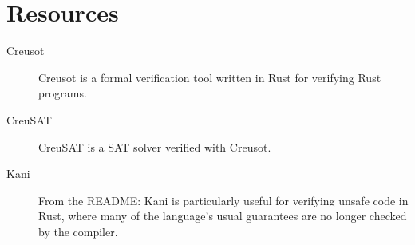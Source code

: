 \documentclass[12pt]{article}
\begin{document}
\section{Resources}

\begin{description}
  \item[Creusot] \cite{denisCreusot2023} \cite{denisCreusotFoundryDeductive2022}

    Creusot is a formal verification tool written in Rust for verifying Rust programs.
    
  \item[CreuSAT] \cite{skotamCreuSAT2023}

    CreuSAT is a SAT solver verified with Creusot.
    
  \item[Kani] \cite{Kani2023}

    From the README: Kani is particularly useful for verifying unsafe code in
    Rust, where many of the language's usual guarantees are no longer checked by
    the compiler.

\end{description}

\printbibliography
\end{document}
